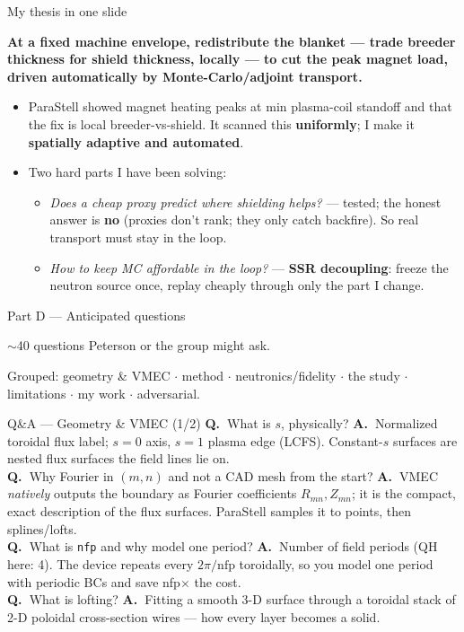 \documentclass[aspectratio=169]{beamer}
\newcommand{\wb}[1]{\begin{tcolorbox}[colback=warn!5,colframe=warn!55,boxsep=2pt,left=4pt,right=4pt,top=3pt,bottom=3pt]#1\end{tcolorbox}}
\newcommand{\q}[1]{\textbf{\color{key}Q.\ }#1}
\newcommand{\an}[1]{\textbf{A.\ }#1}
\begin{document}
\begin{frame}{My thesis in one slide}
  \wb{\centering \textbf{At a fixed machine envelope, redistribute the blanket --- trade breeder thickness for shield thickness, locally --- to cut the peak magnet load, driven automatically by Monte-Carlo/adjoint transport.}}
  \begin{itemize}\small
    \item ParaStell showed magnet heating peaks at min plasma-coil standoff and that the fix is local breeder-vs-shield. It scanned this \textbf{uniformly}; I make it \textbf{spatially adaptive and automated}.
    \item Two hard parts I have been solving:
      \begin{itemize}\footnotesize
        \item[(i)] \emph{Does a cheap proxy predict where shielding helps?} --- tested; the honest answer is \textbf{no} (proxies don't rank; they only catch backfire). So real transport must stay in the loop.
        \item[(ii)] \emph{How to keep MC affordable in the loop?} --- \textbf{SSR decoupling}: freeze the neutron source once, replay cheaply through only the part I change.
      \end{itemize}
  \end{itemize}
\end{frame}

\begin{frame}{Part D --- Anticipated questions}
  \begin{center}\Large\color{key} $\sim$40 questions Peterson or the group might ask.\end{center}
  \footnotesize Grouped: geometry \& VMEC $\cdot$ method $\cdot$ neutronics/fidelity $\cdot$ the study $\cdot$ limitations $\cdot$ my work $\cdot$ adversarial.
\end{frame}

\begin{frame}{Q\&A --- Geometry \& VMEC (1/2)}
  \small
  \q{What is $s$, physically?} \an{Normalized toroidal flux label; $s=0$ axis, $s=1$ plasma edge (LCFS). Constant-$s$ surfaces are nested flux surfaces the field lines lie on.}\\[2pt]
  \q{Why Fourier in $(m,n)$ and not a CAD mesh from the start?} \an{VMEC \emph{natively} outputs the boundary as Fourier coefficients $R_{mn},Z_{mn}$; it is the compact, exact description of the flux surfaces. ParaStell samples it to points, then splines/lofts.}\\[2pt]
  \q{What is \texttt{nfp} and why model one period?} \an{Number of field periods (QH here: 4). The device repeats every $2\pi/\text{nfp}$ toroidally, so you model one period with periodic BCs and save nfp$\times$ the cost.}\\[2pt]
  \q{What is lofting?} \an{Fitting a smooth 3-D surface through a toroidal stack of 2-D poloidal cross-section wires --- how every layer becomes a solid.}
\end{frame}
\end{document}
